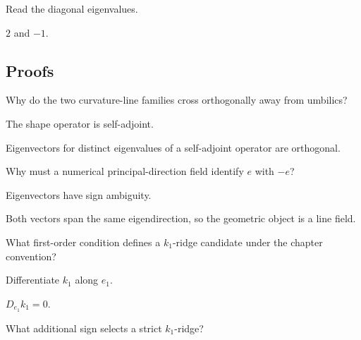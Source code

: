 \begin{hint}
Read the diagonal eigenvalues.
\end{hint}

\begin{solution}
\(2\) and \(-1\).
\end{solution}

\subsection*{Proofs}

\begin{exercise}\label{exr:vii42-ped-06}
Why do the two curvature-line families cross orthogonally away from umbilics?
\end{exercise}

\begin{hint}
The shape operator is self-adjoint.
\end{hint}

\begin{solution}
Eigenvectors for distinct eigenvalues of a self-adjoint operator are orthogonal.
\end{solution}

\begin{exercise}\label{exr:vii42-ped-07}
Why must a numerical principal-direction field identify \(e\) with \(-e\)?
\end{exercise}

\begin{hint}
Eigenvectors have sign ambiguity.
\end{hint}

\begin{solution}
Both vectors span the same eigendirection, so the geometric object is a line field.
\end{solution}

\begin{exercise}\label{exr:vii42-ped-08}
What first-order condition defines a \(k_1\)-ridge candidate under the chapter convention?
\end{exercise}

\begin{hint}
Differentiate \(k_1\) along \(e_1\).
\end{hint}

\begin{solution}
\(D_{e_1}k_1=0\).
\end{solution}

\begin{exercise}\label{exr:vii42-ped-09}
What additional sign selects a strict \(k_1\)-ridge?
\end{exercise}

